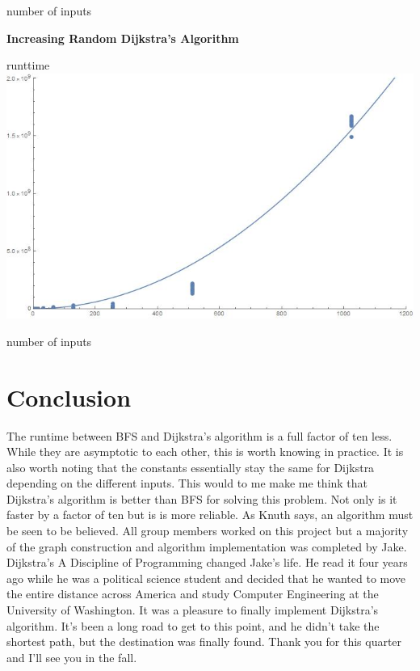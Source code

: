\documentclass[12pt]{report}
\begin{document}
 \centerline{number of inputs}
 \centerline{\textbf{Increasing Random Dijkstra's Algorithm}}
 runttime \includegraphics[scale=.5]{incdij.jpg}\\
 \centerline{number of inputs}
 \newpage
 \section*{Conclusion}
The runtime between BFS and Dijkstra's algorithm is a full factor of ten less.
While they are asymptotic to each other, this is worth knowing in practice. It
is also worth noting that the constants essentially stay the same for Dijkstra
depending on the different inputs. This would to me make me think that Dijkstra's
algorithm is better than BFS for solving this problem. Not only is it faster by a factor
of ten but is is more reliable. As Knuth says, an algorithm must be seen to be believed.
All group members worked on this project but a majority of the graph construction
and algorithm implementation was completed by Jake. Dijkstra's A Discipline of Programming
changed Jake's life. He read it four years ago while he was a political science
student and decided that he wanted to move the entire distance across America 
and study Computer Engineering at the University of Washington. It was a pleasure
to finally implement Dijkstra's algorithm. It's been a long road to get to this
point, and he didn't take the shortest path, but the destination was finally found.
Thank you for this quarter and I'll see you in the fall.  
\newpage
\end{document}
